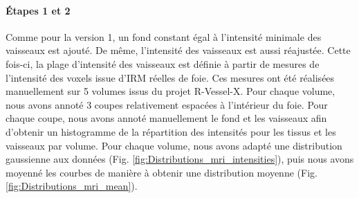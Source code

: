 \paragraph{Étapes 1 et 2}
Comme pour la version 1, un fond constant égal à l'intensité minimale des vaisseaux est ajouté. De même, l'intensité des vaisseaux est aussi réajustée. Cette fois-ci, la plage d'intensité des vaisseaux est définie à partir de mesures de l'intensité des voxels issue d'IRM réelles de foie. Ces mesures ont été réalisées manuellement sur 5 volumes issus du projet R-Vessel-X. Pour chaque volume, nous avons annoté 3 coupes relativement espacées à l'intérieur du foie. Pour chaque coupe, nous avons annoté manuellement le fond et les vaisseaux afin d'obtenir un histogramme de la répartition des intensités pour les tissus et les vaisseaux par volume. Pour chaque volume, nous avons adapté une distribution gaussienne aux données (Fig. \ref{fig:Distributions_mri_intensities}),  puis nous avons moyenné les courbes de manière à obtenir une distribution moyenne (Fig. \ref{fig:Distributions_mri_mean}).

